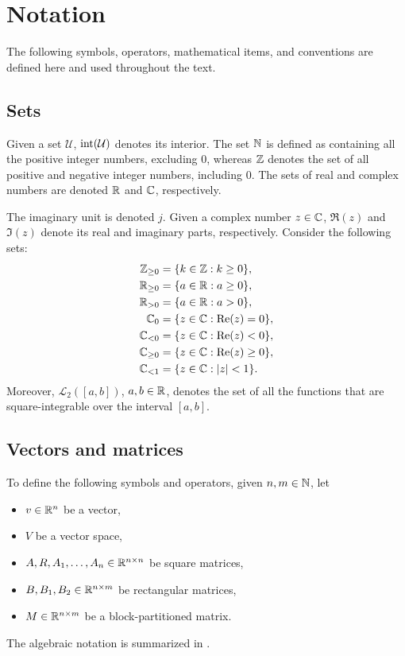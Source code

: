 \section*{Notation}
The following symbols, operators, mathematical items, and conventions are defined here and used throughout the text.

\subsection*{Sets}
Given a set $\mathcal{U}$, $\operatorname{int}(\mathcal{U})$ denotes its interior. The set $\mathbb{N}$ is defined as containing all the positive integer numbers, excluding $0$, whereas $\mathbb{Z}$ denotes the set of all positive and negative integer numbers, including $0$. The sets of real and complex numbers are denoted $\mathbb{R}$ and $\mathbb{C}$, respectively.

The imaginary unit is denoted $j$.
Given a complex number $z\in\mathbb{C}$, $\Re(z)$ and $\Im(z)$ denote its real and imaginary parts, respectively.
Consider the following sets:
\begin{align*}
  \mathbb{Z}_{\geq0} &= \{k \in \mathbb{Z}:k\geq0\},\\
  \mathbb{R}_{\geq0} &= \{a \in \mathbb{R}:a\geq0\},\\
  \mathbb{R}_{>0} &= \{a \in \mathbb{R}:a>0\},\\
  \mathbb{C}_0 &= \{z \in \mathbb{C}:\operatorname{Re}(z)=0\},\\
  \mathbb{C}_{<0} &= \{z \in \mathbb{C}:\operatorname{Re}(z)<0\},\\
  \mathbb{C}_{\geq0} &= \{z \in \mathbb{C}:\operatorname{Re}(z)\geq0\},\\
  \mathbb{C}_{<1} &= \{z \in \mathbb{C}:|z|<1\}.
\end{align*}
Moreover, $\mathcal{L}_2([a,b])$, $a,b\in\mathbb{R}$, denotes the set of all the functions that are square-integrable over the interval $[a,b]$.

\subsection*{Vectors and matrices}
To define the following symbols and operators, given $n,m\in\mathbb{N}$, let
\begin{itemize}
  \item $v\in\mathbb{R}^n$ be a vector,
  \item $V$ be a vector space,
  \item $A,R,A_1,\dotsc,A_n\in\mathbb{R}^{n \times n}$ be square matrices,
  \item $B,B_1,B_2\in\mathbb{R}^{n \times m}$ be rectangular matrices,
  \item $M\in\mathbb{R}^{n \times m}$ be a block-partitioned matrix.
\end{itemize}
The algebraic notation is summarized in .


